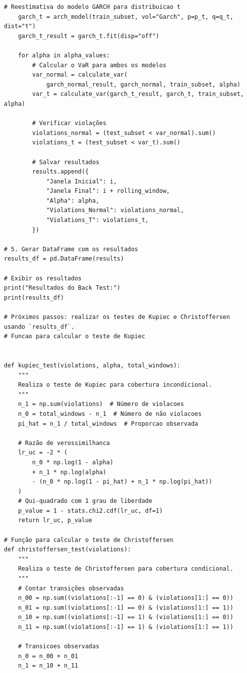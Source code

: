 \documentclass[a4paper, 12pt]{article}
\begin{document}
\begin{lstlisting}[style=python]
    # Reestimativa do modelo GARCH para distribuicao t
    garch_t = arch_model(train_subset, vol="Garch", p=p_t, q=q_t, dist="t")
    garch_t_result = garch_t.fit(disp="off")

    for alpha in alpha_values:
        # Calcular o VaR para ambos os modelos
        var_normal = calculate_var(
            garch_normal_result, garch_normal, train_subset, alpha)
        var_t = calculate_var(garch_t_result, garch_t, train_subset, alpha)

        # Verificar violações
        violations_normal = (test_subset < var_normal).sum()
        violations_t = (test_subset < var_t).sum()

        # Salvar resultados
        results.append({
            "Janela Inicial": i,
            "Janela Final": i + rolling_window,
            "Alpha": alpha,
            "Violations_Normal": violations_normal,
            "Violations_T": violations_t,
        })

# 5. Gerar DataFrame com os resultados
results_df = pd.DataFrame(results)

# Exibir os resultados
print("Resultados do Back Test:")
print(results_df)

# Próximos passos: realizar os testes de Kupiec e Christoffersen usando `results_df`.
# Funcao para calcular o teste de Kupiec


def kupiec_test(violations, alpha, total_windows):
    """
    Realiza o teste de Kupiec para cobertura incondicional.
    """
    n_1 = np.sum(violations)  # Número de violacoes
    n_0 = total_windows - n_1  # Número de não violacoes
    pi_hat = n_1 / total_windows  # Proporcao observada

    # Razão de verossimilhanca
    lr_uc = -2 * (
        n_0 * np.log(1 - alpha)
        + n_1 * np.log(alpha)
        - (n_0 * np.log(1 - pi_hat) + n_1 * np.log(pi_hat))
    )
    # Qui-quadrado com 1 grau de liberdade
    p_value = 1 - stats.chi2.cdf(lr_uc, df=1)
    return lr_uc, p_value

# Função para calcular o teste de Christoffersen
def christoffersen_test(violations):
    """
    Realiza o teste de Christoffersen para cobertura condicional.
    """
    # Contar transições observadas
    n_00 = np.sum((violations[:-1] == 0) & (violations[1:] == 0))
    n_01 = np.sum((violations[:-1] == 0) & (violations[1:] == 1))
    n_10 = np.sum((violations[:-1] == 1) & (violations[1:] == 0))
    n_11 = np.sum((violations[:-1] == 1) & (violations[1:] == 1))

    # Transicoes observadas
    n_0 = n_00 + n_01
    n_1 = n_10 + n_11


\end{lstlisting}
\end{document}
